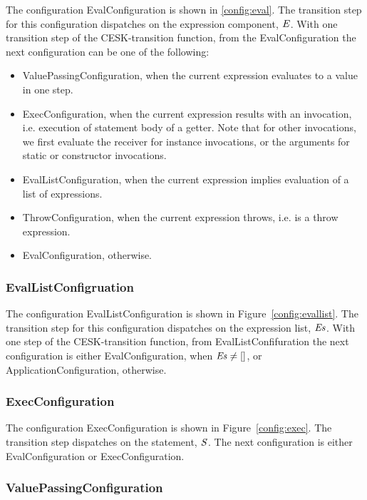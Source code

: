 \documentclass{article}
\begin{document}
The configuration EvalConfiguration is shown in \ref{config:eval}.
The transition step for this configuration dispatches on the expression component, $\mathit{E}$.
With one transition step of the CESK-transition function, from the EvalConfiguration the next configuration can be one of the following:
\begin{itemize}
\item ValuePassingConfiguration, when the current expression evaluates to a value in one step.
\item ExecConfiguration, when the current expression results with an invocation, i.e. execution of statement body of a getter.
Note that for other invocations, we first evaluate the receiver for instance invocations, or the arguments for static or constructor invocations.
\item EvalListConfiguration, when the current expression implies evaluation of a list of expressions.
\item ThrowConfiguration, when the current expression throws, i.e. is a throw expression.
\item EvalConfiguration, otherwise.
\end{itemize}

\subsubsection{EvalListConfigruation}
\label{subsubsec:evallistconfig}
The configuration EvalListConfiguration is shown in Figure~\ref{config:evallist}.
The transition step for this configuration dispatches on the expression list, $\mathit{E}\mathit{s}$.
With one step of the CESK-transition function, from EvalListConfifuration the next configuration is either EvalConfiguration, when $\mathit{E}\mathit{s} \neq []$, or ApplicationConfiguration, otherwise.

\subsubsection{ExecConfiguration}
\label{subsubsec:execconfig}

The configuration ExecConfiguration is shown in Figure~\ref{config:exec}.
The transition step dispatches on the statement, $\mathit{S}$.
The next configuration is either EvalConfiguration or ExecConfiguration.

\subsubsection{ValuePassingConfiguration}
\label{suubsubsec:valuepassingconfig}
\end{document}
